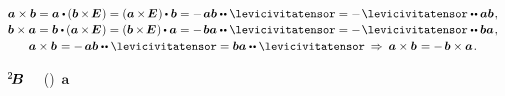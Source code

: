 \begin{otherlanguage}{russian}
\nopagebreak\begin{equation}\label{crossproductoftwovectors}
\begin{array}{c}
\bm{a} \times \bm{b}
= \bm{a} \dotp \hspace{-0.1ex} \left( \bm{b} \hspace{-0.1ex} \times \hspace{-0.25ex} \UnitDyad \hspace{.1ex} \right)
= \left( \bm{a} \hspace{-0.1ex} \times \hspace{-0.25ex} \UnitDyad \hspace{.1ex} \right) \hspace{-0.1ex} \dotp \bm{b}
= - \hspace{.25ex} \bm{a} \bm{b} \dotdotp \levicivitatensor
= - \hspace{.2ex} \levicivitatensor \dotdotp \bm{a} \bm{b}
\hspace{.15ex} ,
\\[.15em]
%
\bm{b} \times \bm{a}
= \bm{b} \dotp \hspace{-0.1ex} \left( \bm{a} \hspace{-0.1ex} \times \hspace{-0.25ex} \UnitDyad \hspace{.1ex} \right)
= \left( \bm{b} \hspace{-0.1ex} \times \hspace{-0.25ex} \UnitDyad \hspace{.1ex} \right)  \hspace{-0.1ex} \dotp \bm{a}
= - \hspace{.25ex} \bm{b} \bm{a} \dotdotp \levicivitatensor
= - \hspace{.2ex} \levicivitatensor \dotdotp \bm{b} \bm{a}
\hspace{.15ex} ,
\\[.2em]
%
\bm{a} \times \bm{b} \hspace{.16ex}
= - \hspace{.33ex} \bm{a} \bm{b} \dotdotp \levicivitatensor
= \bm{b} \bm{a} \dotdotp \levicivitatensor
\:\Rightarrow\:
\bm{a} \times \bm{b} \hspace{.16ex} = - \hspace{.32ex} \bm{b} \times \bm{a}
\hspace{.2ex} .
\end{array}
\end{equation}

\vspace{-0.2em} \noindent
{}  ~${\hspace{-0.2ex}^2\hspace{-0.16em}\bm{B}}$
~~()~$\bm{a}$


\end{otherlanguage}
